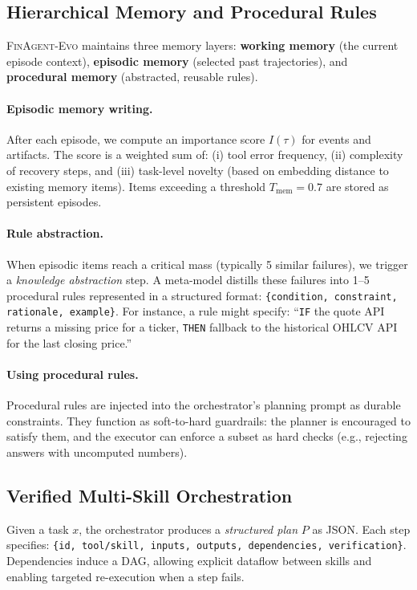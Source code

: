 \documentclass{article}
\begin{document}
\subsection{Hierarchical Memory and Procedural Rules}
\textsc{FinAgent-Evo} maintains three memory layers:
\textbf{working memory} (the current episode context), \textbf{episodic memory} (selected past trajectories), and \textbf{procedural memory} (abstracted, reusable rules).

\paragraph{Episodic memory writing.}
After each episode, we compute an importance score $I(\tau)$ for events and artifacts. The score is a weighted sum of: (i) tool error frequency, (ii) complexity of recovery steps, and (iii) task-level novelty (based on embedding distance to existing memory items). Items exceeding a threshold $T_{\text{mem}}=0.7$ are stored as persistent episodes.

\paragraph{Rule abstraction.}
When episodic items reach a critical mass (typically 5 similar failures), we trigger a \emph{knowledge abstraction} step. A meta-model distills these failures into 1--5 procedural rules represented in a structured format:
\texttt{\{condition, constraint, rationale, example\}}.
For instance, a rule might specify: ``\texttt{IF} the quote API returns a missing price for a ticker, \texttt{THEN} fallback to the historical OHLCV API for the last closing price.''

\paragraph{Using procedural rules.}
Procedural rules are injected into the orchestrator's planning prompt as durable constraints. They function as soft-to-hard guardrails: the planner is encouraged to satisfy them, and the executor can enforce a subset as hard checks (e.g., rejecting answers with uncomputed numbers).

\subsection{Verified Multi-Skill Orchestration}
Given a task $x$, the orchestrator produces a \emph{structured plan} $P$ as JSON. Each step specifies:
\texttt{\{id, tool/skill, inputs, outputs, dependencies, verification\}}.
Dependencies induce a DAG, allowing explicit dataflow between skills and enabling targeted re-execution when a step fails.
\end{document}
